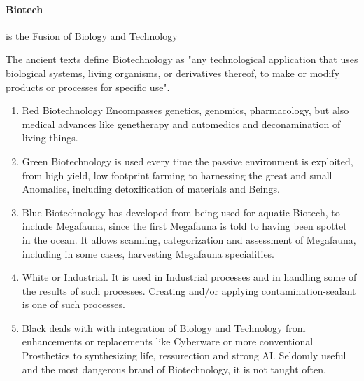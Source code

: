         \paragraph{Biotech} is the Fusion of Biology and Technology \par The ancient texts define Biotechnology as
        "any technological application that uses biological systems, living organisms, or derivatives thereof, to make
        or modify products or processes for specific use".
        \begin{enumerate}[label= -]
            \item{Red} Biotechnology Encompasses genetics, genomics, pharmacology, but also medical advances like
            genetherapy and automedics and deconamination of living things.
            \item{Green} Biotechnology is used every time the passive environment is exploited, from high yield,
            low footprint farming to harnessing the great and small Anomalies, including detoxification of materials and
            Beings.
            \item{Blue} Biotechnology has developed from being used for aquatic Biotech, to include Megafauna, since the
            first Megafauna is told to having been spottet in the ocean.
            It allows scanning, categorization and
            assessment of Megafauna, including in some cases, harvesting Megafauna specialities.
            \item{White} or Industrial.
            It is used in Industrial processes and in handling some of the results of such
            processes.
            Creating and/or applying contamination-sealant is one of such processes.
            \item{Black} deals with with integration of Biology and Technology from enhancements or replacements like
            Cyberware or more conventional Prosthetics to synthesizing life, ressurection and strong AI. Seldomly useful
            and the most dangerous brand of Biotechnology, it is not taught often.
        \end{enumerate}
    \pagebreak
